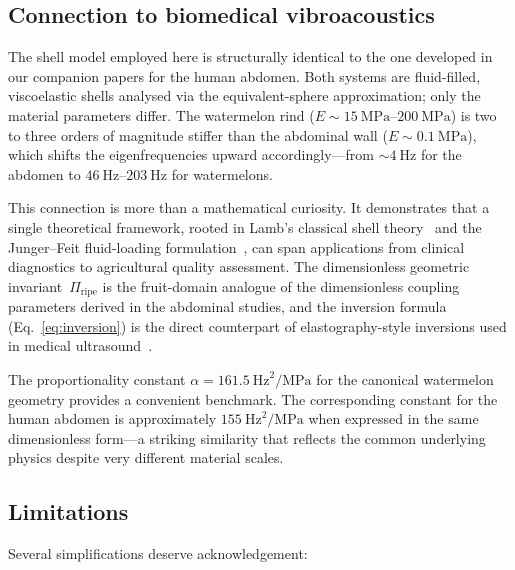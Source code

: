 \subsection{Connection to biomedical vibroacoustics}
\label{sec:biomedical}

The shell model employed here is structurally identical to the one
developed in our companion papers for the human abdomen.  Both systems
are fluid-filled, viscoelastic shells analysed via the equivalent-sphere
approximation; only the material parameters differ.  The watermelon rind
($E \sim \SIrange{15}{200}{\mega\pascal}$) is two to three orders of
magnitude stiffer than the abdominal wall
($E \sim \SI{0.1}{\mega\pascal}$), which shifts the eigenfrequencies
upward accordingly---from $\sim\SI{4}{\hertz}$ for the abdomen to
$\SIrange{46}{203}{\hertz}$ for watermelons.

This connection is more than a mathematical curiosity.  It demonstrates
that a single theoretical framework, rooted in Lamb's classical shell
theory~\cite{lamb1882} and the Junger--Feit fluid-loading
formulation~\cite{Junger1986}, can span applications from clinical
diagnostics to agricultural quality assessment.  The dimensionless
geometric invariant~$\Pi_{\mathrm{ripe}}$ is the fruit-domain analogue
of the dimensionless coupling parameters derived in the abdominal
studies, and the inversion formula (Eq.~\ref{eq:inversion}) is the
direct counterpart of elastography-style inversions used in medical
ultrasound~\cite{parker2011imaging}.

The proportionality constant $\alpha = \SI{161.5}{\hertz\squared
\per\mega\pascal}$ for the canonical watermelon geometry provides a
convenient benchmark.  The corresponding constant for the human abdomen
is approximately $\SI{155}{\hertz\squared\per\mega\pascal}$ when
expressed in the same dimensionless form---a striking similarity that
reflects the common underlying physics despite very different material
scales.

\subsection{Limitations}
\label{sec:limitations}

Several simplifications deserve acknowledgement:

